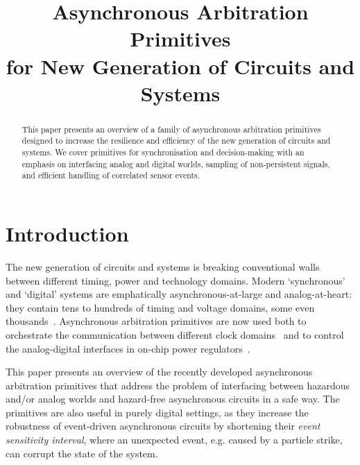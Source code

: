 \documentclass[conference]{IEEEtran}
\begin{document}
\title{Asynchronous Arbitration Primitives\\for New Generation of Circuits and Systems\vspace{-3mm}}
\author{
}

\maketitle

\begin{abstract}
This paper presents an overview of a family of asynchronous arbitration primitives designed
to increase the resilience and efficiency of the new generation of circuits and systems.
We cover primitives for synchronisation and decision-making with an emphasis on interfacing
analog and digital worlds, sampling of non-persistent signals, and efficient handling of
correlated sensor events.
\end{abstract}


\section{Introduction}

The new generation of circuits and systems is breaking conventional walls between
different timing, power and technology domains. Modern `synchronous' and `digital'
systems are emphatically asynchronous-at-large and analog-at-heart: they contain tens
to hundreds of timing and voltage domains, some even thousands~\cite{2017_bohnenstiehl_kilocore}.
Asynchronous arbitration primitives are now used both to orchestrate the communication
between different clock domains~\cite{2017_jiang_noc} and to control the analog-digital
interfaces in on-chip power regulators~\cite{2017_sokolov_a4a}.


This paper presents an overview of the recently developed asynchronous arbitration
primitives that address the problem of interfacing between hazardous and/or analog
worlds and hazard-free asynchronous circuits in a safe way. The primitives are
also useful in purely digital settings, as they increase the robustness of event-driven
asynchronous circuits by shortening their \emph{event sensitivity interval}, where an unexpected
event, e.g. caused by a particle strike, can corrupt the state of the system.
\end{document}
